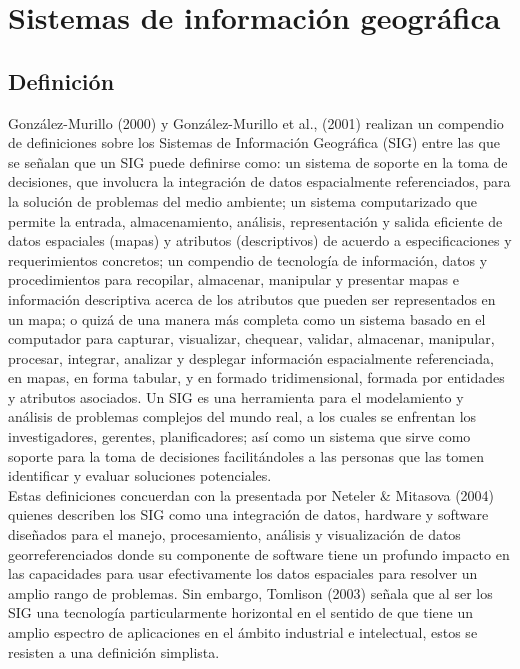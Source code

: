 \documentclass[12pt,hidelinks]{article}
\begin{document}
\newpage
\tableofcontents
\thispagestyle{empty}
\newpage

\section{ Sistemas de información geográfica}
\subsection{Definición}
González-Murillo (2000) y González-Murillo et al., (2001) realizan un compendio de
definiciones sobre los Sistemas de Información Geográfica (SIG) entre las que se señalan que un SIG
puede definirse como: un sistema de soporte en la toma de decisiones, que involucra la integración
de datos espacialmente referenciados, para la solución de problemas del medio ambiente; un
sistema computarizado que permite la entrada, almacenamiento, análisis, representación y salida
eficiente de datos espaciales (mapas) y atributos (descriptivos) de acuerdo a especificaciones y
requerimientos concretos; un compendio de tecnología de información, datos y procedimientos para
recopilar, almacenar, manipular y presentar mapas e información descriptiva acerca de los atributos
que pueden ser representados en un mapa; o quizá de una manera más completa como un sistema
basado en el computador para capturar, visualizar, chequear, validar, almacenar, manipular,
procesar, integrar, analizar y desplegar información espacialmente referenciada, en mapas, en
forma tabular, y en formado tridimensional, formada por entidades y atributos asociados. Un SIG es
una herramienta para el modelamiento y análisis de problemas complejos del mundo real, a los
cuales se enfrentan los investigadores, gerentes, planificadores; así como un sistema que sirve como
soporte para la toma de decisiones facilitándoles a las personas que las tomen identificar y evaluar
soluciones potenciales. \\[0.1 in]
Estas definiciones concuerdan con la presentada por Neteler & Mitasova (2004) quienes
describen los SIG como una integración de datos, hardware y software diseñados para el manejo,
procesamiento, análisis y visualización de datos georreferenciados donde su componente de
software tiene un profundo impacto en las capacidades para usar efectivamente los datos espaciales
para resolver un amplio rango de problemas. Sin embargo, Tomlison (2003) señala que al ser los SIG
una tecnología particularmente horizontal en el sentido de que tiene un amplio espectro de
aplicaciones en el ámbito industrial e intelectual, estos se resisten a una definición simplista.
\end{document}
